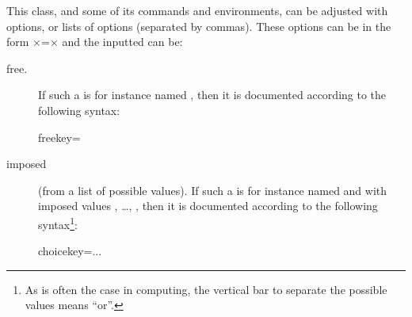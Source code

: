 \documentclass[english,nolocaltoc]{nwejmart}
\newtheorem[style=definition]{fact}
\newtheorem[title=experience]{experience}
\newtheorem[title-plural=rings]{ring}
\newtheorem[title=ideal,title-plural=ideals]{ideal}
\begin{document}
This class, and some of its commands and environments, can be adjusted
with options, or lists of options (separated by commas). These options
can be in the form ×=×  and the inputted
 can be:
\begin{description}
\item[free.] If such a  is for instance named
  ,  then it is documented according to the following syntax: 
  \begin{docKey*}{freekey}{=}{}
  \end{docKey*}
\item[imposed] (from a list of possible values). If such a 
  is for instance named   and with imposed values
  , \dots{}, ,  then it is
  documented according to the following syntax\footnote{As is often
    the case in computing, the vertical bar to separate the possible
    values means \enquote{or}.}:
  \begin{docKey*}{choicekey}{=\textbar...\textbar{}}{}
  \end{docKey*}
\end{description}
\end{document}
